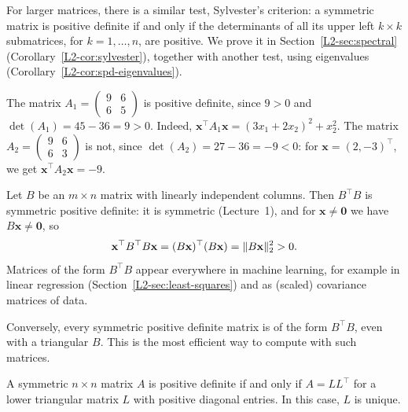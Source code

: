 For larger matrices, there is a similar test, Sylvester's criterion: a symmetric matrix is positive definite if and only if the determinants of all its upper left $k \times k$ submatrices, for $k = 1, \ldots, n$, are positive. We prove it in Section~\ref{L2-sec:spectral} (Corollary~\ref{L2-cor:sylvester}), together with another test, using eigenvalues (Corollary~\ref{L2-cor:spd-eigenvalues}).

\begin{example}
    The matrix $A_1 = \begin{pmatrix} 9 & 6 \\ 6 & 5 \end{pmatrix}$ is positive definite, since $9 > 0$ and $\det(A_1) = 45 - 36 = 9 > 0$. Indeed, $\mathbf{x}^\top A_1 \mathbf{x} = (3x_1 + 2x_2)^2 + x_2^2$. The matrix $A_2 = \begin{pmatrix} 9 & 6 \\ 6 & 3 \end{pmatrix}$ is not, since $\det(A_2) = 27 - 36 = -9 < 0$: for $\mathbf{x} = (2, -3)^\top$, we get $\mathbf{x}^\top A_2 \mathbf{x} = -9$.
\end{example}

\begin{example}\label{L2-ex:BTB}
    Let $B$ be an $m \times n$ matrix with linearly independent columns. Then $B^\top B$ is symmetric positive definite: it is symmetric (Lecture~1), and for $\mathbf{x} \neq \mathbf{0}$ we have $B\mathbf{x} \neq \mathbf{0}$, so
    \[\mathbf{x}^\top B^\top B \mathbf{x} = (B\mathbf{x})^\top (B\mathbf{x}) = \lVert B\mathbf{x} \rVert_2^2 > 0.\]
    Matrices of the form $B^\top B$ appear everywhere in machine learning, for example in linear regression (Section~\ref{L2-sec:least-squares}) and as (scaled) covariance matrices of data.
\end{example}

Conversely, every symmetric positive definite matrix is of the form $B^\top B$, even with a triangular $B$. This is the most efficient way to compute with such matrices.

\begin{theorem}\label{L2-thm:cholesky}
    A symmetric $n \times n$ matrix $A$ is positive definite if and only if $A = LL^\top$ for a lower triangular matrix $L$ with positive diagonal entries. In this case, $L$ is unique.
\end{theorem}

